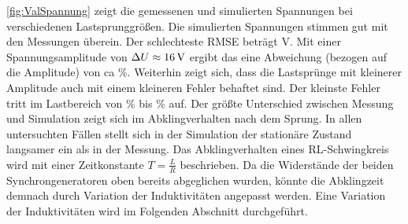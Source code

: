 \cref{fig:ValSpannung} zeigt die gemessenen und simulierten Spannungen bei verschiedenen Lastsprunggrößen. Die simulierten Spannungen stimmen gut mit den Messungen überein. Der schlechteste RMSE beträgt \unit[1,33]{V}. Mit einer Spannungsamplitude von $\Delta U\approx\unit[16]{V}$ ergibt das eine Abweichung (bezogen auf die Amplitude) von ca \unit[8,3]{\%}. Weiterhin zeigt sich, dass  die Lastsprünge mit kleinerer Amplitude auch mit einem kleineren Fehler behaftet sind. Der kleinste Fehler tritt im Lastbereich von \unit[50]{\%} bis \unit[100]{\%} auf. Der größte Unterschied zwischen Messung und Simulation zeigt sich im Abklingverhalten nach dem Sprung. In allen untersuchten Fällen stellt sich in der Simulation der stationäre Zustand langsamer ein als in der Messung. Das Abklingverhalten eines RL-Schwingkreis wird mit einer Zeitkonstante $T=\frac{L}{R}$ beschrieben. Da die Widerstände der beiden Synchrongeneratoren oben bereits abgeglichen wurden, könnte die Abklingzeit demnach durch Variation der Induktivitäten angepasst werden. Eine Variation der Induktivitäten wird im Folgenden Abschnitt durchgeführt.
